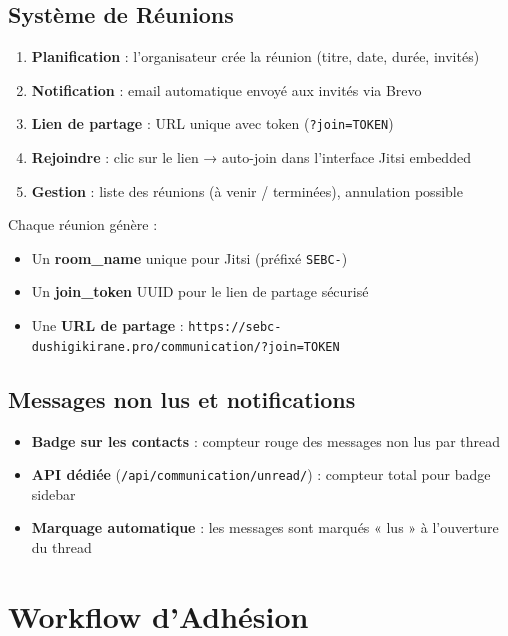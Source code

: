 \documentclass[12pt,a4paper]{article}
\begin{document}
\subsection{Système de Réunions}

\begin{infobox}
\begin{enumerate}
    \item \textbf{Planification} : l'organisateur crée la réunion (titre, date, durée, invités)
    \item \textbf{Notification} : email automatique envoyé aux invités via Brevo
    \item \textbf{Lien de partage} : URL unique avec token (\texttt{?join=TOKEN})
    \item \textbf{Rejoindre} : clic sur le lien → auto-join dans l'interface Jitsi embedded
    \item \textbf{Gestion} : liste des réunions (à venir / terminées), annulation possible
\end{enumerate}
\end{infobox}

Chaque réunion génère :
\begin{itemize}
    \item Un \textbf{room\_name} unique pour Jitsi (préfixé \texttt{SEBC-})
    \item Un \textbf{join\_token} UUID pour le lien de partage sécurisé
    \item Une \textbf{URL de partage} : \texttt{https://sebc-dushigikirane.pro/communication/?join=TOKEN}
\end{itemize}

\subsection{Messages non lus et notifications}

\begin{itemize}
    \item \textbf{Badge sur les contacts} : compteur rouge des messages non lus par thread
    \item \textbf{API dédiée} (\texttt{/api/communication/unread/}) : compteur total pour badge sidebar
    \item \textbf{Marquage automatique} : les messages sont marqués « lus » à l'ouverture du thread
\end{itemize}

\section{Workflow d'Adhésion}
\end{document}
